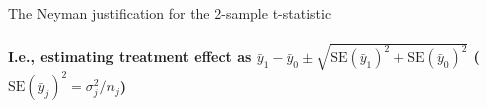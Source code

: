 \begin{frame}{The Neyman justification for the 2-sample t-statistic} \pause
 \framesubtitle{I.e., estimating treatment effect as %
$\bar{y}_{1} - \bar{y}_0   \pm \sqrt{\mathrm{SE}(\bar{y}_{1})^{2} +
  \mathrm{SE}(\bar{y}_{0}) ^{2}}$ ($\mathrm{SE}(\bar{y}_{j})^{2} = \sigma_{j}^{2}/n_{j} $) }
\pause


\end{frame}

